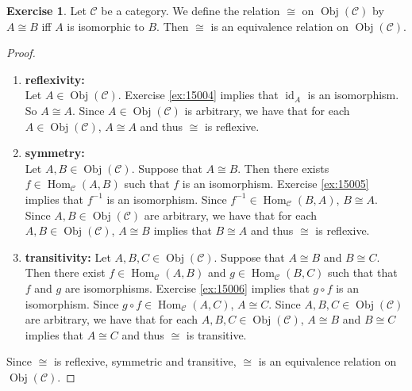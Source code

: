 \documentclass{book}
\theoremstyle{definition}
\newtheorem{ex}[definition]{Exercise}
\newcommand{\MC}{\mathcal{C}}
\newcommand{\lex}[1]{\label{ex:#1}}
\newcommand{\rex}[1]{Exercise \ref{ex:#1}}
\DeclareMathOperator{\id}{id}
\DeclareMathOperator{\Obj}{Obj}
\DeclareMathOperator{\Hom}{Hom}
\DeclareMathOperator*{\0}{\mbf{0}}
\DeclareMathOperator*{\1}{\mbf{1}}
\begin{document}
	\begin{ex} \lex{15008}
		Let $\MC$ be a category. We define the relation $\cong$ on $\Obj(\MC)$ by $A \cong B$ iff $A$ is isomorphic to $B$. Then $\cong$ is an equivalence relation on $\Obj(\MC)$.
	\end{ex}
	
	\begin{proof} \
		\begin{enumerate}
			\item \textbf{reflexivity: } \\
			Let $A \in \Obj(\MC)$. \rex{15004} implies that $\id_A$ is an isomorphism. So $A \cong A$. Since $A \in \Obj(\MC)$ is arbitrary, we have that for each $A \in \Obj(\MC)$, $A \cong A$ and thus $\cong$ is reflexive. 
			\item \textbf{symmetry: } \\
			Let $A, B \in \Obj(\MC)$. Suppose that $A \cong B$. Then there exists $f \in \Hom_{\MC}(A,B)$ such that $f$ is an isomorphism. \rex{15005} implies that $f^{-1}$ is an isomorphism. Since $f^{-1} \in \Hom_{\MC}(B, A)$, $B \cong A$.  Since $A, B \in \Obj(\MC)$ are arbitrary, we have that for each $A, B \in \Obj(\MC)$, $A \cong B$ implies that $B \cong A$ and thus $\cong$ is reflexive. 
			\item \textbf{transitivity: }
			Let $A, B, C \in \Obj(\MC)$. Suppose that $A \cong B$ and $B \cong C$. Then there exist $f \in \Hom_{\MC}(A,B)$ and $g \in \Hom_{\MC}(B, C)$ such that that $f$ and $g$ are isomorphisms. \rex{15006} implies that $g \circ f$ is an isomorphism. Since $g \circ f \in \Hom_{\MC}(A, C)$, $A \cong C$. Since $A, B, C \in \Obj(\MC)$ are arbitrary, we have that for each $A, B, C \in \Obj(\MC)$, $A \cong B$ and $B \cong C$ implies that $A \cong C$ and thus $\cong$ is transitive. 
		\end{enumerate}
		Since $\cong$ is reflexive, symmetric and transitive, $\cong$ is an equivalence relation on $\Obj(\MC)$.
	\end{proof}
	
\end{document}
